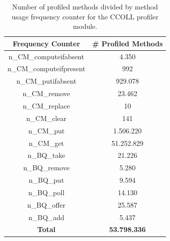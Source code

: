 \documentclass[]{usiinfthesis}
\begin{document}
\begin{table}
\centering
\caption{Number of profiled methods divided by method usage frequency counter for the CCOLL profiler module.}
\begin{tabular}{|c|c|}
\hline
\textbf{Frequency Counter} & \textbf{# Profiled Methods} \\
\hline
n\_CM\_computeifabsent	&	 4.350 	 \\ 
n\_CM\_computeifpresent	&	 992 	 \\ 
n\_CM\_putifabsent	&	 929.078 	 \\ 
n\_CM\_remove	&	 23.462 	 \\ 
n\_CM\_replace	&	 10 	 \\ 
n\_CM\_clear	&	 141 	 \\ 
n\_CM\_put	&	 1.506.220 	 \\ 
n\_CM\_get	&	 51.252.829 	 \\ 
n\_BQ\_take	&	 21.226 	 \\ 
n\_BQ\_remove	&	 5.280 	 \\ 
n\_BQ\_put	&	 9.594 	 \\ 
n\_BQ\_poll	&	 14.130 	 \\ 
n\_BQ\_offer	&	 25.587 	 \\ 
n\_BQ\_add	&	 5.437 	 \\ 
\hline
\hline
\textbf{Total}	&	  \textbf{53.798.336}    	 \\ 
\hline
\end{tabular}
\end{table}%
\end{document}
